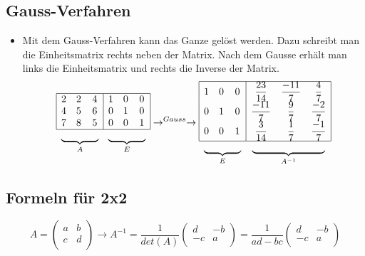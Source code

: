 \subsection{Gauss-Verfahren}
	\begin{itemize}
		\item Mit dem Gauss-Verfahren kann das Ganze gelöst werden. Dazu schreibt man die Einheitsmatrix rechts neben der Matrix. Nach dem Gausse erhält man links die Einheitsmatrix und rechts die Inverse der Matrix.
			\begin{equation*}
				\begin{array}{|ccc|ccc|}
					\hline		
					2 & 2 & 4 & 1 & 0 & 0 \\
					4 & 5 & 6 & 0 & 1 & 0 \\
					7 & 8 & 5 & 0 & 0 & 1 \\
					\hline
					\multicolumn{3}{c}{\underbrace{\hphantom{st\kern4\tabcolsep 1}}_{A}} &
					\multicolumn{3}{c}{\underbrace{\hphantom{st\kern4\tabcolsep 1}}_{E}}
					\end{array}
				\rightarrow^{Gauss} \rightarrow
				\begin{array}{|ccc|ccc|}
				\hline		
					1 & 0 & 0 & {\displaystyle \frac{23}{14}} & {\displaystyle \frac{-11}{7}} & {\displaystyle \frac{4}{7}} \\
					0 & 1 & 0 & {\displaystyle \frac{-11}{7}} & {\displaystyle \frac{9}{7}} & {\displaystyle \frac{-2}{7}} \\
					0 & 0 & 1 & {\displaystyle \frac{3}{14}} & {\displaystyle \frac{1}{7}} & {\displaystyle \frac{-1}{7}} \\
				\hline 
				\multicolumn{3}{c}{\underbrace{\hphantom{st\kern4\tabcolsep 1}}_{E}} &
				\multicolumn{3}{c}{\underbrace{\hphantom{st\kern10\tabcolsep 1}}_{A^{-1}}}
				\end{array}
			\end{equation*}
	\end{itemize}

\subsection{Formeln für 2x2}
	\begin{equation*}
		A=\left(
		\begin{array}{ccc}
			a & b\\
			c & d\\
		\end{array}
		\right)
		\rightarrow
		A^{-1}=\displaystyle \frac{1}{det(A)}\left(
		\begin{array}{ccc}
		d & -b\\
		-c & a\\
		\end{array}
		\right)
		= \displaystyle \frac{1}{ad-bc}\left(
		\begin{array}{ccc}
		d & -b\\
		-c & a\\
		\end{array}
		\right)				
	\end{equation*} 

	